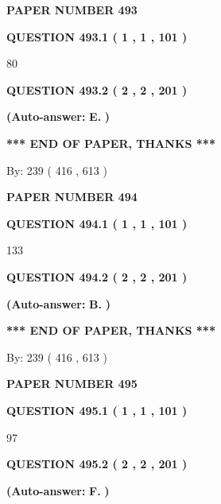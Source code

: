 \documentclass{ctexart}
\begin{document}
   
 {\textbf{ \Large{ PAPER NUMBER  493  }}}
   
   
   
   
  
  
{\textbf{\large{QUESTION
493.1 
 ( 1 , 1 , 101 )
}}}

80
  
  
{\textbf{\large{QUESTION
493.2 
 ( 2 , 2 , 201 )
}}}
 
 
{\textbf{(Auto-answer:}}
{\textbf{\large{
E.}}}
{\textbf{)}}
 
 
   
   
   
   
\vspace{1.0in} 
{\textbf{\large{ *** END OF PAPER, THANKS *** }}} 
   
   
\hspace{1.0in} By: 
 239 ( 416 ,  613 )
   
   
   
   
\newpage 
\setcounter{page}{ 
   494001 } 
   
   
 {\textbf{ \Large{ PAPER NUMBER  494  }}}
   
   
   
   
  
  
{\textbf{\large{QUESTION
494.1 
 ( 1 , 1 , 101 )
}}}

133
  
  
{\textbf{\large{QUESTION
494.2 
 ( 2 , 2 , 201 )
}}}
 
 
{\textbf{(Auto-answer:}}
{\textbf{\large{
B.}}}
{\textbf{)}}
 
 
   
   
   
   
\vspace{1.0in} 
{\textbf{\large{ *** END OF PAPER, THANKS *** }}} 
   
   
\hspace{1.0in} By: 
 239 ( 416 ,  613 )
   
   
   
   
\newpage 
\setcounter{page}{ 
   495001 } 
   
   
 {\textbf{ \Large{ PAPER NUMBER  495  }}}
   
   
   
   
  
  
{\textbf{\large{QUESTION
495.1 
 ( 1 , 1 , 101 )
}}}

97
  
  
{\textbf{\large{QUESTION
495.2 
 ( 2 , 2 , 201 )
}}}
 
 
{\textbf{(Auto-answer:}}
{\textbf{\large{
F.}}}
{\textbf{)}}
 
\end{document}
